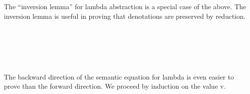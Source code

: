 The ``inversion lemma'' for lambda abstraction is a special case of the
above. The inversion lemma is useful in proving that denotations are
preserved by reduction.

\begin{fence}
\begin{code}%
\>[0]\AgdaSpace{}%
\AgdaSymbol{:}\AgdaSpace{}%
\AgdaSymbol{\}\{}\AgdaSpace{}%
\AgdaSymbol{:}\AgdaSpace{}%
\AgdaSpace{}%
\AgdaSymbol{\}\{}\AgdaSpace{}%
\AgdaSymbol{:}\AgdaSpace{}%
\AgdaSpace{}%
\AgdaOperator{\AgdaInductiveConstructor{,}}\AgdaSpace{}%
\AgdaSpace{}%
\AgdaSpace{}%
\AgdaSymbol{\}\{}\AgdaSpace{}%
\AgdaSpace{}%
\AgdaSymbol{:}\AgdaSpace{}%
\AgdaSymbol{\}}\<%
\\
\>[0][@{}l@{\AgdaIndent{0}}]%
\>[2]%
\>[267I]\AgdaSpace{}%
\AgdaSpace{}%
\AgdaSpace{}%
\AgdaSpace{}%
\AgdaSpace{}%
\AgdaSpace{}%
\AgdaSpace{}%
\<%
\\
\>[.][@{}l@{}]\<[267I]%
\>[4]\AgdaComment{-----------------}\<%
\\
%
\>[2]\AgdaSpace{}%
\AgdaSymbol{(}\AgdaSpace{}%
\AgdaSpace{}%
\AgdaSymbol{)}\AgdaSpace{}%
\AgdaSpace{}%
\AgdaSpace{}%
\AgdaSpace{}%
\<%
\\
\>[0]\AgdaSymbol{\{}\AgdaSpace{}%
\AgdaSymbol{=}\AgdaSpace{}%
\AgdaSymbol{\}\{}\AgdaSpace{}%
\AgdaSymbol{=}\AgdaSpace{}%
\AgdaSymbol{\}}\AgdaSpace{}%
\AgdaSpace{}%
\AgdaSymbol{=}\AgdaSpace{}%
\AgdaSymbol{\{}\AgdaSpace{}%
\AgdaSymbol{=}\AgdaSpace{}%
\AgdaSpace{}%
\AgdaSpace{}%
\AgdaSymbol{\}}\AgdaSpace{}%
\<%
\end{code}
\end{fence}

The backward direction of the semantic equation for lambda is even
easier to prove than the forward direction. We proceed by induction on
the value v.

